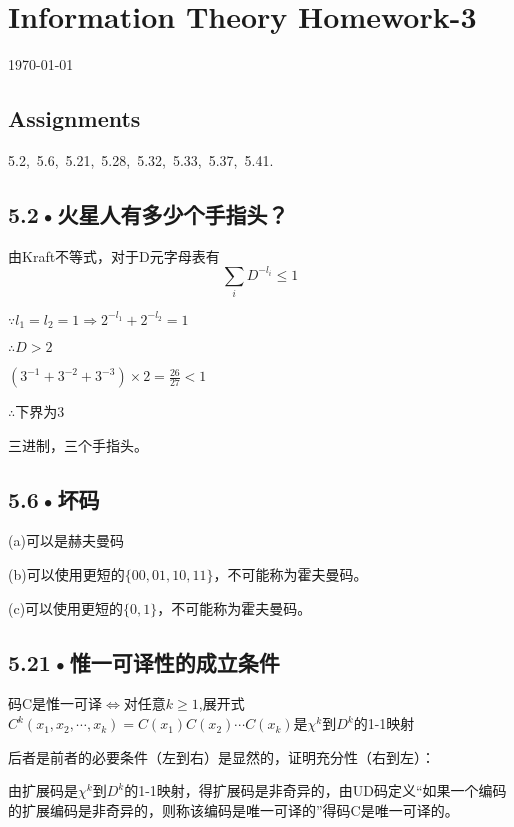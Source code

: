 \documentclass[UTF8]{ctexart}
\begin{document}
\section*{Information Theory Homework-3}
\begin{center}
\today
\end{center}
\subsection*{Assignments}

5.2,\ 5.6,\ 5.21,\ 5.28,\ 5.32,\ 5.33,\ 5.37,\ 5.41.
\subsection*{5.2•火星人有多少个手指头？}
由Kraft不等式，对于D元字母表有$$\sum_i D^{-l_i}\leqslant 1 $$

$\because l_1=l_2=1\Rightarrow 2^{-l_1}+2^{-l_2}=1$

$\therefore D>2$

$(3^{-1}+3^{-2}+3^{-3})\times 2=\frac{26}{27}<1 $

$\therefore$下界为3

三进制，三个手指头。

\subsection*{5.6•坏码}

(a)可以是赫夫曼码

(b)可以使用更短的$\{00,01,10,11\}$，不可能称为霍夫曼码。

(c)可以使用更短的$\{0,1\}$，不可能称为霍夫曼码。

\subsection*{5.21•惟一可译性的成立条件}
码C是惟一可译$\Leftrightarrow$对任意$k\geqslant 1$,展开式$C^k(x_1,x_2,\cdots ,x_k)=C(x_1)C(x_2)\cdots C(x_k)$是$\chi ^k$到$D^k$的1-1映射

后者是前者的必要条件（左到右）是显然的，证明充分性（右到左）：

由扩展码是$\chi ^k$到$D^k$的1-1映射，得扩展码是非奇异的，由UD码定义“如果一个编码的扩展编码是非奇异的，则称该编码是唯一可译的”得码C是唯一可译的。

\end{document}
